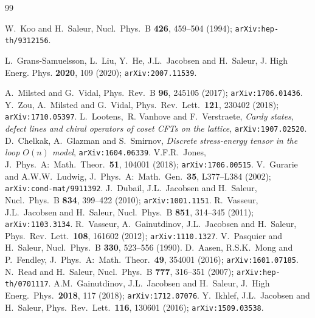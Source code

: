 \documentclass[a4paper,10pt]{article}
\begin{document}
\begin{thebibliography}{99}

 W.\ Koo and H.\ Saleur, Nucl.\ Phys.\ B {\bf 426}, 459--504 (1994); {\tt arXiv:hep-th/9312156}.

 L.\ Grans-Samuelsson, L.\ Liu, Y.\ He, J.L.\ Jacobsen and H.\ Saleur, J. High Energ. Phys. {\bf 2020}, 109 (2020); {\tt arXiv:2007.11539}.


 A.\ Milsted and G.\ Vidal, Phys.\ Rev.\ B {\bf 96}, 245105 (2017); {\tt arXiv:1706.01436}.
 Y.\ Zou, A.\ Milsted and G.\ Vidal, Phys.\ Rev.\ Lett.\ {\bf 121}, 230402 (2018); {\tt arXiv:1710.05397}.
 L.\ Lootens,\ R. Vanhove and F.\ Verstraete, {\sl Cardy states, defect lines and chiral operators of coset CFTs on the lattice}, {\tt arXiv:1907.02520}.
 D.\ Chelkak, A.\ Glazman and S.\ Smirnov, {\sl Discrete stress-energy tensor in the loop $O(n)$ model}, {\tt arXiv:1604.06339}.
 V.F.R.\ Jones, J.\ Phys.\ A:\ Math.\ Theor.\ {\bf 51}, 104001 (2018); {\tt arXiv:1706.00515}.
 V.\ Gurarie and A.W.W.\ Ludwig, J.\ Phys.\ A:\ Math.\ Gen.\ {\bf 35}, L377--L384 (2002); {\tt arXiv:cond-mat/9911392}.
 J.\ Dubail, J.L.\ Jacobsen and H.\ Saleur, %
Nucl.\ Phys.\ B {\bf 834}, 399--422 (2010); {\tt arXiv:1001.1151}.
 R.\ Vasseur, J.L.\ Jacobsen and H.\ Saleur, Nucl.\ Phys.\ B {\bf 851}, 314--345 (2011); {\tt arXiv:1103.3134}.
 R.\ Vasseur, A.\ Gainutdinov, J.L.\ Jacobsen and H.\ Saleur, Phys.\ Rev.\ Lett.\ {\bf 108}, 161602 (2012); {\tt arXiv:1110.1327}.
 V.\ Pasquier and H.\ Saleur, Nucl.\ Phys.\ B {\bf 330}, 523--556 (1990).
 D.\ Aasen, R.S.K.\ Mong and P.\ Fendley, J.\ Phys.\ A:\ Math.\ Theor.\ {\bf 49}, 354001 (2016); {\tt arXiv:1601.07185}.
 N.\ Read and H.\ Saleur, %
Nucl.\ Phys.\ B {\bf 777}, 316--351 (2007); {\tt arXiv:hep-th/0701117}.
 A.M.\ Gainutdinov, J.L.\ Jacobsen and H.\ Saleur, %
J.\ High Energ.\ Phys.\ {\bf 2018},  117 (2018); {\tt arXiv:1712.07076}. 
 Y.\ Ikhlef, J.L.\ Jacobsen and H.\ Saleur, Phys.\ Rev.\ Lett.\ {\bf 116}, 130601 (2016); {\tt arXiv:1509.03538}.

\end{thebibliography}
\end{document}
